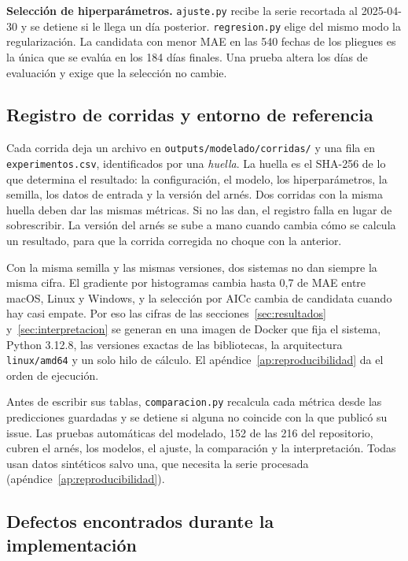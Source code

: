 \textbf{Selección de hiperparámetros.} \texttt{ajuste.py} recibe la serie recortada al 2025-04-30 y se detiene si le llega un día posterior. \texttt{regresion.py} elige del mismo modo la regularización. La candidata con menor MAE en las 540 fechas de los pliegues es la única que se evalúa en los 184 días finales. Una prueba altera los días de evaluación y exige que la selección no cambie.

\subsection{Registro de corridas y entorno de referencia}\label{sec:imp-registro}

Cada corrida deja un archivo en \texttt{outputs/\allowbreak{}modelado/\allowbreak{}corridas/} y una fila en \texttt{experimentos.csv}, identificados por una \emph{huella}. La huella es el SHA-256 de lo que determina el resultado: la configuración, el modelo, los hiperparámetros, la semilla, los datos de entrada y la versión del arnés. Dos corridas con la misma huella deben dar las mismas métricas. Si no las dan, el registro falla en lugar de sobrescribir. La versión del arnés se sube a mano cuando cambia cómo se calcula un resultado, para que la corrida corregida no choque con la anterior.

Con la misma semilla y las mismas versiones, dos sistemas no dan siempre la misma cifra. El gradiente por histogramas cambia hasta 0,7 de MAE entre macOS, Linux y Windows, y la selección por AICc cambia de candidata cuando hay casi empate. Por eso las cifras de las secciones~\ref{sec:resultados} y~\ref{sec:interpretacion} se generan en una imagen de Docker que fija el sistema, Python 3.12.8, las versiones exactas de las bibliotecas, la arquitectura \texttt{linux/amd64} y un solo hilo de cálculo. El apéndice~\ref{ap:reproducibilidad} da el orden de ejecución.

Antes de escribir sus tablas, \texttt{comparacion.py} recalcula cada métrica desde las predicciones guardadas y se detiene si alguna no coincide con la que publicó su issue. Las pruebas automáticas del modelado, 152 de las 216 del repositorio, cubren el arnés, los modelos, el ajuste, la comparación y la interpretación. Todas usan datos sintéticos salvo una, que necesita la serie procesada (apéndice~\ref{ap:reproducibilidad}).

\subsection{Defectos encontrados durante la implementación}\label{sec:imp-defectos}

